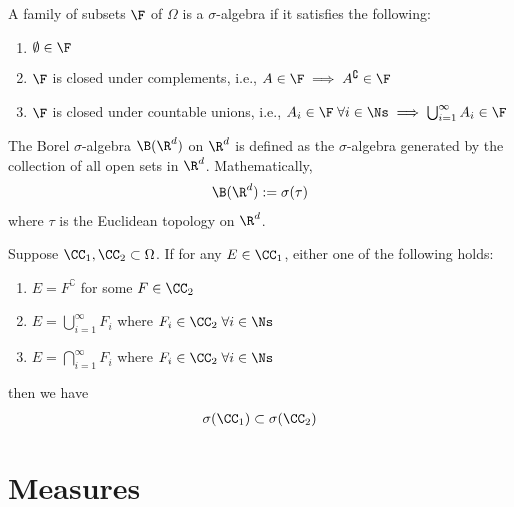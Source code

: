 \documentclass[thmcnt=section, 12pt]{elegantbook}
\begin{document}

\begin{definition}
    A family of subsets $\F$ of $\Omega$ is a $\sigma$-algebra  if it satisfies the following:
    \begin{enumerate}
        \item $\emptyset \in \F$
        \item $\F$ is closed under complements, i.e., $A \in \F \implies A^\complement \in \F$
        \item $\F$ is closed under countable unions, i.e., $A_i \in \F \; \forall i \in \Ns \implies \bigcup_{i=1}^\infty A_i \in \F $
    \end{enumerate}
\end{definition}


\begin{definition}
    The Borel $\sigma$-algebra $\B(\R^d)$ on $\R^d$ is defined as the $\sigma$-algebra generated by the collection of all open sets in $\R^d$. Mathematically, 
    \begin{align*}
        \B(\R^d) := \sigma(\tau)
    \end{align*}
    where $\tau$ is the Euclidean topology on $\R^d$.
\end{definition}


\begin{lemma}
    Suppose $\CC_1, \CC_2 \subset \Omega$. If for any $E \in \CC_1$, either one of the following holds:
    \begin{enumerate}
        \item $E = F^\complement$ for some $F \in \CC_2$
        \item $E = \bigcup_{i=1}^\infty F_i$ where $F_i \in \CC_2 \; \forall i \in \Ns$
        \item $E = \bigcap_{i=1}^\infty F_i$ where $F_i \in \CC_2 \; \forall i \in \Ns$
    \end{enumerate}
    then we have 
    \begin{align*}
        \sigma(\CC_1) \subset \sigma(\CC_2)
    \end{align*}
\end{lemma}


\section{Measures}
\end{document}
